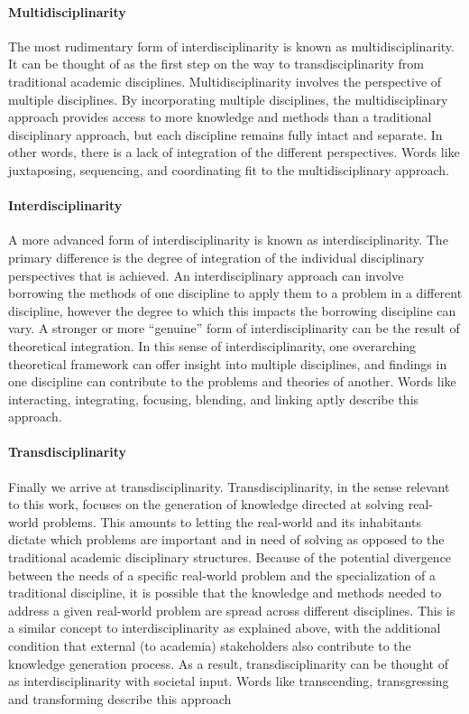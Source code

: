 \documentclass[a4paper]{article}
\begin{document}
\paragraph{Multidisciplinarity}

The most rudimentary form of interdisciplinarity is known as
multidisciplinarity. It can be thought of as the first step on the way to
transdisciplinarity from traditional academic disciplines.
Multidisciplinarity involves the perspective of multiple disciplines. By
incorporating multiple disciplines, the multidisciplinary approach provides
access to more knowledge and methods than a traditional disciplinary approach,
but each discipline remains fully intact and separate. In other words, there
is a lack of integration of the different perspectives. Words like
juxtaposing, sequencing, and coordinating fit to the multidisciplinary
approach.

\paragraph{Interdisciplinarity}

A more advanced form of interdisciplinarity is known as interdisciplinarity.
The primary difference is the degree of integration of the individual
disciplinary perspectives that is achieved. An interdisciplinary approach can
involve borrowing the methods of one discipline to apply them to a problem in
a different discipline, however the degree to which this impacts the borrowing
discipline can vary. A stronger or more ``genuine'' form of
interdisciplinarity can be the result of theoretical integration. In this
sense of interdisciplinarity, one overarching theoretical framework can offer
insight into multiple disciplines, and findings in one discipline can
contribute to the problems and theories of another. Words like interacting,
integrating, focusing, blending, and linking aptly describe this approach.

\paragraph{Transdisciplinarity}

Finally we arrive at transdisciplinarity. Transdisciplinarity, in the sense
relevant to this work, focuses on the generation of knowledge directed at
solving real-world problems. This amounts to letting the real-world and its
inhabitants dictate which problems are important and in need of solving as
opposed to the traditional academic disciplinary structures. Because of the
potential divergence between the needs of a specific real-world problem and
the specialization of a traditional discipline, it is possible that the
knowledge and methods needed to address a given real-world problem are spread
across different disciplines. This is a similar concept to
interdisciplinarity as explained above, with the additional condition that
external (to academia) stakeholders also contribute to the knowledge
generation process. As a result, transdisciplinarity can be thought of as
interdisciplinarity with societal input. Words like transcending,
transgressing and transforming describe this approach
\end{document}
